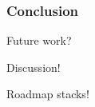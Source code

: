 \begin{frame}
   \frametitle{Conclusion}

   Future work?

   Discussion!

   Roadmap stacks!
   
\end{frame}
